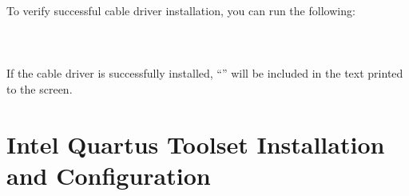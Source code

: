 \begin{flushleft}
To verify successful cable driver installation, you can run the following:\medskip\newline
{} \\
 \\
 \\
 \\\medskip
If the cable driver is successfully installed, ``'' will be included in the text printed to the screen.
%
%
%
%
%
\end{flushleft}
\pagebreak

\newpage

\section{Intel Quartus Toolset Installation and Configuration}
